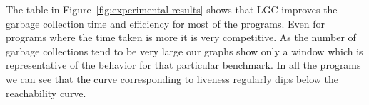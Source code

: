 \documentclass[9pt]{sigplanconf}
\begin{document}



The table in Figure~\ref{fig:experimental-results} shows that LGC improves the 
garbage collection time and efficiency for most of the programs. 
Even for programs where the time taken is more it is very competitive. 
As the number of garbage collections tend to be very large our graphs show only 
a window which is representative of the behavior for that particular benchmark. 
In all the programs we can see that the curve corresponding to liveness regularly 
dips below the reachability curve. 
\end{document}
